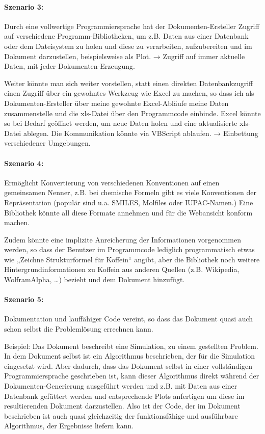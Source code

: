 \paragraph{Szenario 3:} Durch eine vollwertige Programmiersprache hat
der Dokumenten-Ersteller Zugriff auf verschiedene Programm-Bibliotheken,
um z.B. Daten aus einer Datenbank oder dem Dateisystem zu holen und diese
zu verarbeiten, aufzubereiten und im Dokument darzustellen, beispielsweise
als Plot. → Zugriff auf immer aktuelle Daten, mit jeder Dokumenten-Erzeugung.

Weiter könnte man sich weiter vorstellen, statt einen direkten Datenbankzugriff
einen Zugriff über ein gewohntes Werkzeug wie Excel zu machen,
so dass ich als Dokumenten-Ersteller über meine gewohnte Excel-Abläufe
meine Daten zusammenstelle und die xls-Datei über den Programmcode einbinde.
Excel könnte so bei Bedarf geöffnet
werden, um neue Daten holen und eine aktualisierte xls-Datei ablegen. Die
Kommunikation könnte via VBScript ablaufen. → Einbettung
verschiedener Umgebungen.

\paragraph{Szenario 4:} Ermöglicht Konvertierung von verschiedenen
Konventionen auf einen gemeinsamen Nenner, z.B. bei chemische Formeln
gibt es viele Konventionen der Repräsentation (populär sind u.a.
SMILES, Molfiles oder IUPAC-Namen.)
Eine Bibliothek könnte all diese Formate annehmen und
für die Webansicht konform machen.

Zudem könnte eine implizite Anreicherung der Informationen vorgenommen werden,
so dass der Benutzer im Programmcode lediglich programmatisch etwas wie
„Zeichne Strukturformel für Koffein“ angibt,
aber die Bibliothek noch weitere Hintergrundinformationen
zu Koffein aus anderen Quellen (z.B. Wikipedia, WolframAlpha, \ldots) bezieht
und dem Dokument hinzufügt.

\paragraph{Szenario 5:} Dokumentation
und lauffähiger Code vereint, so dass das Dokument quasi auch schon selbst
die Problemlösung errechnen kann.

Beispiel: Das Dokument beschreibt eine Simulation, zu einem gestellten
Problem. In dem Dokument selbst ist ein Algorithmus beschrieben, der
für die Simulation eingesetzt wird. Aber dadurch, dass das Dokument selbst
in einer vollständigen Programmiersprache geschrieben ist, kann dieser
Algorithmus direkt während der Dokumenten-Generierung ausgeführt werden
und z.B. mit Daten aus einer Datenbank gefüttert werden und entsprechende Plots
anfertigen um diese im resultierenden Dokument darzustellen.
Also ist der Code, der im Dokument beschrieben ist auch quasi gleichzeitig
der funktionsfähige und ausführbare Algorithmus, der Ergebnisse liefern kann.

